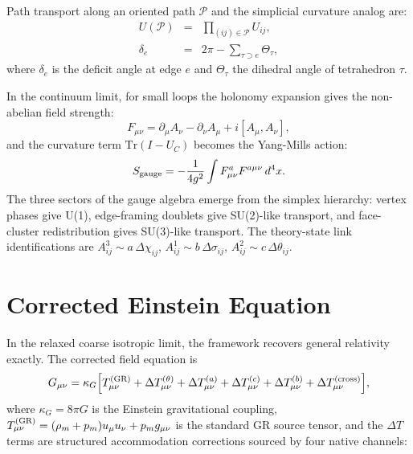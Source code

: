 \documentclass[11pt,twocolumn]{article}
\begin{document}
Path transport along an oriented path $\mathcal{P}$ and the simplicial curvature analog are:
\begin{eqnarray}
U(\mathcal{P}) &=& \prod_{(ij)\in\mathcal{P}} U_{ij}, \label{eq:path-transport} \\
\delta_e &=& 2\pi - \sum_{\tau \supset e} \Theta_\tau, \label{eq:deficit}
\end{eqnarray}
where $\delta_e$ is the deficit angle at edge $e$ and $\Theta_\tau$ the dihedral angle of tetrahedron $\tau$.

In the continuum limit, for small loops the holonomy expansion gives the non-abelian field strength:\cite{kogut}
\begin{equation}
\label{eq:yang-mills}
F_{\mu\nu} = \partial_\mu A_\nu - \partial_\nu A_\mu + i[A_\mu, A_\nu],
\end{equation}
and the curvature term $\mathrm{Tr}(I - U_C)$ becomes the Yang-Mills action:
\begin{equation}
\label{eq:gauge-action}
S_{\rm gauge} = -\frac{1}{4g^2}\int F^a_{\mu\nu} F^{a\mu\nu}\,d^4x.
\end{equation}
The three sectors of the gauge algebra emerge from the simplex hierarchy: vertex phases give U(1), edge-framing doublets give SU(2)-like transport, and face-cluster redistribution gives SU(3)-like transport.
The theory-state link identifications are $A_{ij}^3 \sim a\,\Delta\chi_{ij}$, $A_{ij}^1 \sim b\,\Delta\sigma_{ij}$, $A_{ij}^2 \sim c\,\Delta\theta_{ij}$.


\section{Corrected Einstein Equation}
\label{sec:gravity}

In the relaxed coarse isotropic limit, the framework recovers general relativity exactly.
The corrected field equation is
\begin{equation}
\label{eq:corrected-einstein}
G_{\mu\nu} = \kappa_G\Bigl[T^{(\rm GR)}_{\mu\nu} + \Delta T^{(\theta)}_{\mu\nu} + \Delta T^{(a)}_{\mu\nu} + \Delta T^{(c)}_{\mu\nu} + \Delta T^{(b)}_{\mu\nu} + \Delta T^{(\rm cross)}_{\mu\nu}\Bigr],
\end{equation}
where $\kappa_G = 8\pi G$ is the Einstein gravitational coupling, $T^{(\rm GR)}_{\mu\nu} = (\rho_m + p_m)u_\mu u_\nu + p_m g_{\mu\nu}$ is the standard GR source tensor, and the $\Delta T$ terms are structured accommodation corrections sourced by four native channels:
\end{document}
